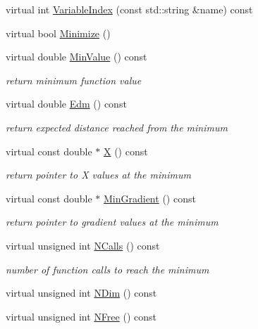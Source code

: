 \begin{DoxyCompactItemize}
virtual int \mbox{\hyperlink{classROOT_1_1Minuit2_1_1Minuit2Minimizer_a93839e851d16fff50898af2159d8863d}{Variable\+Index}} (const std\+::string \&name) const
\item 
virtual bool \mbox{\hyperlink{classROOT_1_1Minuit2_1_1Minuit2Minimizer_af5d2da195d2b1a7eac6d9b8859eec2b9}{Minimize}} ()
\item 
virtual double \mbox{\hyperlink{classROOT_1_1Minuit2_1_1Minuit2Minimizer_a4a1c7fc174527aefab3d8c87bf8c0672}{Min\+Value}} () const
\begin{DoxyCompactList}\small\item\em return minimum function value \end{DoxyCompactList}\item 
virtual double \mbox{\hyperlink{classROOT_1_1Minuit2_1_1Minuit2Minimizer_ab9c1bfaaaf4c12acd1fd96ece3509269}{Edm}} () const
\begin{DoxyCompactList}\small\item\em return expected distance reached from the minimum \end{DoxyCompactList}\item 
virtual const double $\ast$ \mbox{\hyperlink{classROOT_1_1Minuit2_1_1Minuit2Minimizer_ac9372eb08937cf14acb8862ba3166c26}{X}} () const
\begin{DoxyCompactList}\small\item\em return pointer to X values at the minimum \end{DoxyCompactList}\item 
virtual const double $\ast$ \mbox{\hyperlink{classROOT_1_1Minuit2_1_1Minuit2Minimizer_a52c6b3a13108b64366b1acd43f7e2b9a}{Min\+Gradient}} () const
\begin{DoxyCompactList}\small\item\em return pointer to gradient values at the minimum \end{DoxyCompactList}\item 
virtual unsigned int \mbox{\hyperlink{classROOT_1_1Minuit2_1_1Minuit2Minimizer_ab5faf7c3dc0b3743eee8352c62a6ccfd}{N\+Calls}} () const
\begin{DoxyCompactList}\small\item\em number of function calls to reach the minimum \end{DoxyCompactList}\item 
virtual unsigned int \mbox{\hyperlink{classROOT_1_1Minuit2_1_1Minuit2Minimizer_a6ed2c7d99296e222f0f43295e302eb9e}{N\+Dim}} () const
\item 
virtual unsigned int \mbox{\hyperlink{classROOT_1_1Minuit2_1_1Minuit2Minimizer_a0aa136c5a94d1e5c6bfcbfb98da7ad2d}{N\+Free}} () const

\end{DoxyCompactItemize}
